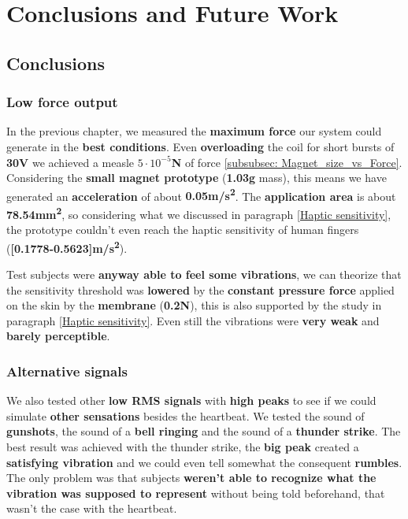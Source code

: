 
\chapter{Conclusions and Future Work}
\label{Chapter6}

\section{Conclusions}

\subsection{Low force output}
In the previous chapter, we measured the \textbf{maximum force} our system could generate in the \textbf{best conditions}.
Even \textbf{overloading} the coil for short bursts of \textbf{30V} we achieved a measle \textbf{$5\cdot10^{-5}$N} of force \ref{subsubsec: Magnet_size_vs_Force}.
Considering the \textbf{small magnet prototype} (\textbf{1.03g} mass), this means we have generated an \textbf{acceleration} of about \textbf{0.05m/s\textsuperscript{2}}.
The \textbf{application area} is about \textbf{78.54mm\textsuperscript{2}}, so considering what we discussed in paragraph \ref{Haptic sensitivity}, the prototype couldn't even reach the haptic sensitivity of human fingers (\textbf{[0.1778-0.5623]m/s\textsuperscript{2}}).

Test subjects were \textbf{anyway able to feel some vibrations}, we can theorize that the sensitivity threshold was \textbf{lowered} by the \textbf{constant pressure force} applied on the skin by the \textbf{membrane} (\textbf{0.2N}), this is also supported by the study in paragraph \ref{Haptic sensitivity}.
Even still the vibrations were \textbf{very weak} and \textbf{barely perceptible}.

\subsection{Alternative signals}
We also tested other \textbf{low RMS signals} with \textbf{high peaks} to see if we could simulate \textbf{other sensations} besides the heartbeat.
We tested the sound of \textbf{gunshots}, the sound of a \textbf{bell ringing} and the sound of a \textbf{thunder strike}.
The best result was achieved with the thunder strike, the \textbf{big peak} created a \textbf{satisfying vibration} and we could even tell somewhat the consequent \textbf{rumbles}.
The only problem was that subjects\textbf{ weren't able to recognize what the vibration was supposed to represent} without being told beforehand, that wasn't the case with the heartbeat.

